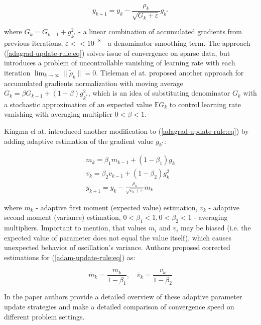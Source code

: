 \begin{equation}
    \label{adagrad-update-rule:eq}
        y_{k+1} = y_k - \frac{\rho_k}{\sqrt{G_k + \varepsilon}} g_{k^*}
\end{equation}

\noindent where $ G_k = G_{k-1} + g_{k^*}^2 $ - a linear combination of accumulated gradients from previous iterations, $ \varepsilon < < 10^{-8} $ - a denominator smoothing term. The approach (\ref{adagrad-update-rule:eq}) solves issue of convergence on sparse data, but introduces a problem of uncontrollable vanishing of learning rate with each iteration $ \lim_{k \to \infty} \| \tilde{\rho}_k \| = 0 $. Tieleman el at. \cite{tieleman2012rmsprop} proposed another approach for accumulated gradients normalization with moving average $ G_k = 
\beta G_{k-1} + (1 - \beta) g_{k^*}^2 $, which is an idea of substituting denominator $ G_k $ with a stochastic approximation of an expected value $ \mathbb{E} G_k $ to control learning rate vanishing with averaging multiplier $ 0 < \beta < 1 $.

Kingma el at. \cite{kingma2017adam} introduced another modification to (\ref{adagrad-update-rule:eq}) by adding adaptive estimation of the gradient value $ g_{k^*} $:

\begin{eqnarray}
    \label{adam-update-rule:eq}
        m_k = \beta_1 m_{k-1} + (1 - \beta_1) g_k \nonumber \\
        v_k = \beta_2 v_{k-1} + (1 - \beta_2) g_k^2 \nonumber \\
        y_{k+1} = y_k - \frac{\rho_k}{\sqrt{v_k + \varepsilon}} m_k
\end{eqnarray}

\noindent where $ m_k $ - adaptive first moment (expected value) estimation, $ v_k $ - adaptive second moment (variance) estimation, $ 0 < \beta_1 < 1, 0 < \beta_2 < 1 $ - averaging multipliers. Important to mention, that values $ m_i $ and $ v_i $ may be biased (i.e. the expected value of parameter does not equal the value itself), which causes unexpected behavior of oscillation’s variance. Authors proposed corrected estimations for (\ref{adam-update-rule:eq}) as:

\begin{equation}
    \label{adam-corrected-estimations:eq}
        \bar{m}_k = \frac{m_k}{1 - \beta_1}, \quad \bar{v}_k = \frac{v_k}{1 - \beta_2}
\end{equation}

In the paper \cite{Norkin_Kozyriev_Norkin_2024} authors provide a detailed overview of these adaptive parameter update strategies and make a detailed comparison of convergence speed on different problem settings.

